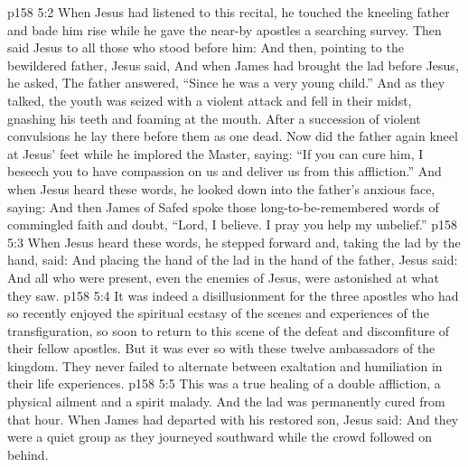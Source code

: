 \vs p158 5:2 When Jesus had listened to this recital, he touched the kneeling father and bade him rise while he gave the near-by apostles a searching survey. Then said Jesus to all those who stood before him:  And then, pointing to the bewildered father, Jesus said,  And when James had brought the lad before Jesus, he asked,  The father answered, “Since he was a very young child.” And as they talked, the youth was seized with a violent attack and fell in their midst, gnashing his teeth and foaming at the mouth. After a succession of violent convulsions he lay there before them as one dead. Now did the father again kneel at Jesus’ feet while he implored the Master, saying: “If you can cure him, I beseech you to have compassion on us and deliver us from this affliction.” And when Jesus heard these words, he looked down into the father’s anxious face, saying:  And then James of Safed spoke those long\hyp{}to\hyp{}be\hyp{}remembered words of commingled faith and doubt, “Lord, I believe. I pray you help my unbelief.”
\vs p158 5:3 When Jesus heard these words, he stepped forward and, taking the lad by the hand, said:  And placing the hand of the lad in the hand of the father, Jesus said:  And all who were present, even the enemies of Jesus, were astonished at what they saw.
\vs p158 5:4 It was indeed a disillusionment for the three apostles who had so recently enjoyed the spiritual ecstasy of the scenes and experiences of the transfiguration, so soon to return to this scene of the defeat and discomfiture of their fellow apostles. But it was ever so with these twelve ambassadors of the kingdom. They never failed to alternate between exaltation and humiliation in their life experiences.
\vs p158 5:5 This was a true healing of a double affliction, a physical ailment and a spirit malady. And the lad was permanently cured from that hour. When James had departed with his restored son, Jesus said:  And they were a quiet group as they journeyed southward while the crowd followed on behind.
